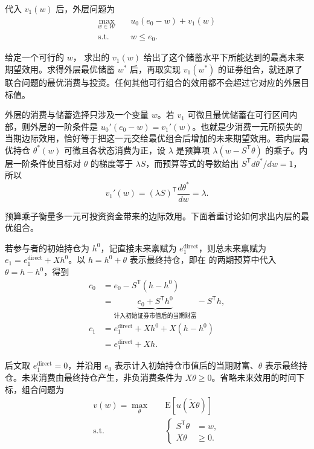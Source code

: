 代入 $v_1(w)$ 后，外层问题为
\begin{equation}
 \begin{aligned}
 \max_{w\in\mathcal W}\quad &u_0(e_0-w)+v_1(w)\\
 \text{s.t.}\quad &w\le e_0.
 \end{aligned}\label{eq:wj-8-7}
\end{equation}

给定一个可行的 $w$， 求出的 $v_1(w)$ 给出了这个储蓄水平下所能达到的最高未来期望效用。求得外层最优储蓄 $w^*$ 后，再取实现 $v_1(w^*)$ 的证券组合，就还原了联合问题的最优消费与投资。任何其他可行组合的效用都不会超过它对应的外层目标值。

外层的消费与储蓄选择只涉及一个变量 $w$。若 $v_1$ 可微且最优储蓄在可行区间内部，则外层的一阶条件是 $u_0'(e_0-w)=v_1'(w)$。也就是少消费一元所损失的当期边际效用，恰好等于把这一元交给最优组合后增加的未来期望效用。若内层最优持仓 $\theta^*(w)$ 可微且各状态消费为正，设 $\lambda$ 是预算项 $\lambda(w-S^{\mathsf T}\theta)$ 的乘子。内层一阶条件使目标对 $\theta$ 的梯度等于 $\lambda S$，而预算等式的导数给出 $S^{\mathsf T}d\theta^*/dw=1$，所以
\[
 v_1'(w)=(\lambda S)^{\mathsf T}\frac{d\theta^*}{dw}=\lambda.
\]

预算乘子衡量多一元可投资资金带来的边际效用。下面着重讨论如何求出内层的最优组合。

若参与者的初始持仓为 $h^0$，记直接未来禀赋为 $e_1^{\mathrm{direct}}$，则总未来禀赋为 $e_1=e_1^{\mathrm{direct}}+Xh^0$。以 $h=h^0+\theta$ 表示最终持仓，即在 的两期预算中代入 $\theta=h-h^0$，得到
\[
 \begin{aligned}
 c_0&=e_0-S^{\mathsf T}(h-h^0)\\
    &=\underbrace{e_0+S^{\mathsf T}h^0}_{\text{计入初始证券市值后的当期财富}}-S^{\mathsf T}h,\\
 c_1&=e_1^{\mathrm{direct}}+Xh^0+X(h-h^0)\\
    &=e_1^{\mathrm{direct}}+Xh.
 \end{aligned}
\]

后文取 $e_1^{\mathrm{direct}}=0$，并沿用 $e_0$ 表示计入初始持仓市值后的当期财富、$\theta$ 表示最终持仓。未来消费由最终持仓产生，非负消费条件为 $X\theta\ge0$。省略未来效用的时间下标，组合问题为
\begin{equation}
 \begin{aligned}
 v(w)=\max_{\theta}\quad &\mathrm E[u(\widetilde X\theta)]\\
 \text{s.t.}\quad &
 \left\{\begin{aligned}
 S^{\mathsf T}\theta&=w,\\
 X\theta&\ge0.
 \end{aligned}\right.
 \end{aligned}\label{eq:wj-8-8}
\end{equation}

